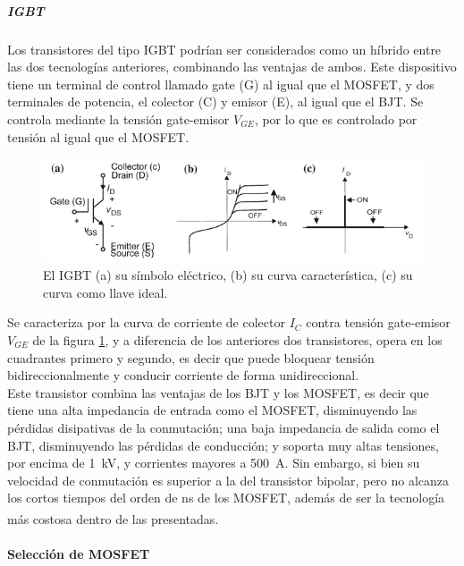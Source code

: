 \subparagraph{IGBT}

Los transistores del tipo IGBT podrían ser considerados como un híbrido entre las dos tecnologías anteriores, combinando las ventajas de ambos. Este dispositivo tiene un terminal de control llamado gate (G) al igual que el MOSFET, y dos terminales de potencia, el colector (C) y emisor (E), al igual que el BJT. Se controla mediante la tensión gate-emisor $V_{GE}$, por lo que es controlado por tensión al igual que el MOSFET.\\

\begin{figure}[h]
    \centering
    \includegraphics[scale=0.6]{Imagenes/IGBT.png}
    \caption{El IGBT (a) su símbolo eléctrico, (b) su curva característica, (c) su curva como llave ideal.}
    \label{igbt}
\end{figure}

Se caracteriza por la curva de corriente de colector $I_C$ contra tensión gate-emisor $V_{GE}$ de la figura \ref{igbt}, y a diferencia de los anteriores dos transistores, opera en los cuadrantes primero y segundo, es decir que puede bloquear tensión bidireccionalmente y conducir corriente de forma unidireccional.\\

Este transistor combina las ventajas de los BJT y los MOSFET, es decir que tiene una alta impedancia de entrada como el MOSFET, disminuyendo las pérdidas disipativas de la conmutación; una baja impedancia de salida como el BJT, disminuyendo las pérdidas de conducción; y soporta muy altas tensiones, por encima de \SI[]{1}[]{\kilo\volt}, y corrientes mayores a \SI[]{500}[]{\ampere}. Sin embargo, si bien su velocidad de conmutación es superior a la del transistor bipolar, pero no alcanza los cortos tiempos del orden de \unit[]{\nano\second} de los MOSFET, además de ser la tecnología más costosa dentro de las presentadas.\textsuperscript{\cite{PotenciaHart}\cite{PowerElecRenewableEnergySystems}}\\

\paragraph{Selección de MOSFET}

